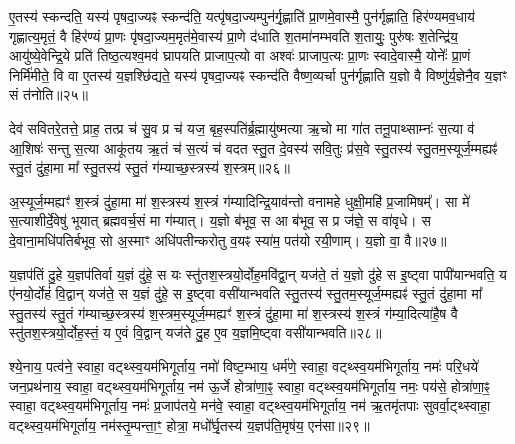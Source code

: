 ए॒तस्य॑ स्कन्दति॒ यस्य॑ पृषदा॒ज्यꣴ स्कन्द॑ति॒ यत्पृ॑षदा॒ज्यम्पुन॑र्गृ॒ह्णाति॑ प्रा॒णमे॒वास्मै॒ पुन॑र्गृह्णाति॒ हिर॑ण्यमव॒धाय॑ गृह्णात्य॒मृतं॒ वै हिर॑ण्यं प्रा॒णः पृ॑षदा॒ज्यम॒मृत॑मे॒वास्य॑ प्रा॒णे द॑धाति श॒तमा॑नम्भवति श॒तायुः॒ पुरु॑षः श॒तेन्द्रि॑य॒ आयु॑ष्ये॒वेन्द्रि॒ये प्रति॑ तिष्ठ॒त्यश्व॒मव॑ घ्रापयति प्राजाप॒त्यो वा अश्वः॑ प्राजाप॒त्यः प्रा॒णः स्वादे॒वास्मै॒ योनेः᳚ प्रा॒णं निर्मि॑मीते॒ वि वा ए॒तस्य॑ य॒ज्ञश्छि॑द्यते॒ यस्य॑ पृषदा॒ज्यꣴ स्कन्द॑ति वैष्ण॒व्यर्चा पुन॑र्गृह्णाति य॒ज्ञो वै विष्णु॑र्य॒ज्ञेनै॒व य॒ज्ञꣳ सं त॑नोति॥२५॥

{\anuvakamend[{ते॒ पृ॒ष॒दा॒ज्यं प्रा॒णो वै योनेः᳚ प्रा॒णन्द्वाविꣳ॑शतिश्च॥६॥}]}

देव॑ सवितरे॒तत्ते॒ प्राह॒ तत्प्र च॑ सु॒व प्र च॑ यज॒ बृह॒स्पति॑र्ब्र॒ह्मायु॑ष्मत्या ऋ॒चो मा गा॑त तनू॒पाथ्साम्नः॑ स॒त्या व॑ आ॒शिषः॑ सन्तु स॒त्या आकू॑तय ऋ॒तं च॑ स॒त्यं च॑ वदत स्तु॒त दे॒वस्य॑ सवि॒तुः प्र॑स॒वे स्तु॒तस्य॑ स्तु॒तम॒स्यूर्ज॒म्मह्यꣴ॑ स्तु॒तं दु॑हा॒मा मा᳚ स्तु॒तस्य॑ स्तु॒तं ग॑म्याच्छ॒स्त्रस्य॑ श॒स्त्रम्॥२६॥

अ॒स्यूर्ज॒म्मह्यꣳ॑ श॒स्त्रं दु॑हा॒मा मा॑ श॒स्त्रस्य॑ श॒स्त्रं ग॑म्यादिन्द्रि॒याव॑न्तो वनामहे धुक्षी॒महि॑ प्र॒जामिषम्᳚। सा मे॑ स॒त्याशीर्दे॒वेषु॑ भूयात् ब्रह्मवर्च॒सं मा ग॑म्यात्। य॒ज्ञो ब॑भूव॒ स आ ब॑भूव॒ स प्र ज॑ज्ञे॒ स वा॑वृधे। स दे॒वाना॒मधि॑पतिर्बभूव॒ सो अ॒स्माꣳ अधि॑पतीन्करोतु व॒यꣴ स्या॑म॒ पत॑यो रयी॒णाम्। य॒ज्ञो वा॒ वै॥२७॥

य॒ज्ञप॑तिं दु॒हे य॒ज्ञप॑तिर्वा य॒ज्ञं दु॑हे॒ स यः स्तु॑तश॒स्त्रयो॒र्दोह॒मवि॑द्वा॒न् यज॑ते॒ तं य॒ज्ञो दु॑हे स इ॒ष्ट्वा पापी॑यान्भवति॒ य ए॑नयो॒र्दोहं॑ वि॒द्वान् यज॑ते॒ स य॒ज्ञं दु॑हे॒ स इ॒ष्ट्वा वसी॑यान्भवति स्तु॒तस्य॑ स्तु॒तम॒स्यूर्ज॒म्मह्यꣴ॑ स्तु॒तं दु॑हा॒मा मा᳚ स्तु॒तस्य॑ स्तु॒तं ग॑म्याच्छ॒स्त्रस्य॑ श॒स्त्रम॒स्यूर्ज॒म्मह्यꣳ॑ श॒स्त्रं दु॑हा॒मा मा॑ श॒स्त्रस्य॑ श॒स्त्रं ग॑म्या॒दित्या॑है॒ष वै स्तु॑तश॒स्त्रयो॒र्दोह॒स्तं॒ य ए॒वं वि॒द्वान् यज॑ते दु॒ह ए॒व य॒ज्ञमि॒ष्ट्वा वसी॑यान्भवति॥२८॥

{\anuvakamend[{श॒स्त्रं वै श॒स्त्रन्दु॑हा॒न्द्वाविꣳ॑शतिश्च॥७॥}]}

श्ये॒नाय॒ पत्व॑ने॒ स्वाहा॒ वट्थ्स्व॒यम॑भिगूर्ताय॒ नमो॑ विष्ट॒म्भाय॒ धर्म॑णे॒ स्वाहा॒ वट्थ्स्व॒यम॑भिगूर्ताय॒ नमः॑ परि॒धये॑ जन॒प्रथ॑नाय॒ स्वाहा॒ वट्थ्स्व॒यम॑भिगूर्ताय॒ नम॑ ऊ॒र्जे होत्रा॑णा॒ꣴ॒ स्वाहा॒ वट्थ्स्व॒यम॑भिगूर्ताय॒ नमः॒ पय॑से॒ होत्रा॑णा॒ꣴ॒ स्वाहा॒ वट्थ्स्व॒यम॑भिगूर्ताय॒ नमः॑ प्र॒जाप॑तये॒ मन॑वे॒ स्वाहा॒ वट्थ्स्व॒यम॑भिगूर्ताय॒ नम॑ ऋ॒तमृ॑तपाः सुवर्वा॒ट्थ्स्वाहा॒ वट्थ्स्व॒यम॑भिगूर्ताय॒ नम॑स्तृ॒म्पन्ता॒ꣳ॒ होत्रा॒ मधो᳚र्घृ॒तस्य॑ य॒ज्ञप॑ति॒मृष॑य॒ एन॑सा॥२९॥

